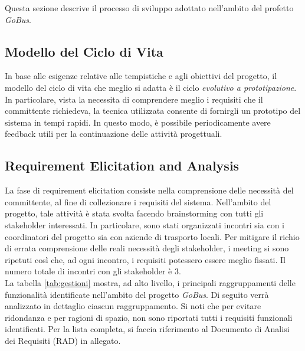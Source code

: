 Questa sezione descrive il processo di sviluppo adottato nell'ambito del profetto \emph{GoBus}.

\subsection{Modello del Ciclo di Vita}
In base alle esigenze relative alle tempistiche e agli obiettivi del progetto, il modello del ciclo di vita che meglio si adatta \`{e} il ciclo \emph{evolutivo a prototipazione}. In particolare, vista la necessita di comprendere meglio i requisiti che il committente richiedeva, la tecnica utilizzata consente di fornirgli un prototipo del sistema in tempi rapidi. In questo modo, \`{e} possibile periodicamente avere feedback utili per la continuazione delle attivit\`{a} progettuali.

\subsection{Requirement Elicitation and Analysis}
La fase di requirement elicitation consiste nella comprensione delle necessit\`{a} del committente, al fine di collezionare i requisiti del sistema. Nell'ambito del progetto, tale attivit\`{a} \`{e} stata svolta facendo brainstorming con tutti gli stakeholder interessati. In particolare, sono stati organizzati incontri sia con i coordinatori del progetto sia con aziende di trasporto locali. Per mitigare il richio di errata comprensione delle reali necessit\`{a} degli stakeholder, i meeting si sono ripetuti così che, ad ogni incontro, i requisiti potessero essere meglio fissati. Il numero totale di incontri con gli stakeholder \`{e} 3.\\
La tabella \ref{tab:gestioni} mostra, ad alto livello, i principali raggruppamenti delle funzionalità identificate nell'ambito del progetto \emph{GoBus}. Di seguito verr\`{a} analizzato in dettaglio ciascun raggruppamento. Si noti che per evitare ridondanza e per ragioni di spazio, non sono riportati tutti i requisiti funzionali identificati. Per la lista completa, si faccia riferimento al Documento di Analisi dei Requisiti (RAD) in allegato.\\

